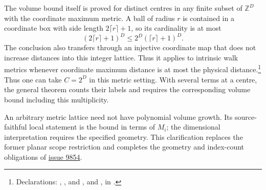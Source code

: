 \documentclass{article}
\begin{document}
The volume bound itself is proved for distinct centres in any finite
subset of $\mathbb Z^D$ with the coordinate maximum metric. A ball of
radius $r$ is contained in a coordinate box with side length
$2\lceil r\rceil+1$, so its cardinality is at most
\[
 (2\lceil r\rceil+1)^D\le2^D(\lceil r\rceil+1)^D.
\]
The conclusion also transfers through an injective coordinate map that
does not increase distances into this integer lattice. Thus it applies
to intrinsic walk metrics whenever coordinate maximum distance is at
most the physical distance.\footnote{Declarations:
,
, and
, and
, in
.}
Thus one can take $C=2^D$ in this metric setting. With several terms at a
centre, the general theorem counts their labels and requires the
corresponding volume bound including this multiplicity.

An arbitrary metric lattice need not have polynomial volume growth.
Its source-faithful local statement is the bound in terms of $M_i$;
the dimensional interpretation requires the specified geometry. This
clarification replaces the former planar scope restriction and completes
the geometry and index-count obligations of
\href{https://github.com/LionSR/TNLean/issues/9854}{issue 9854}.



\end{document}
